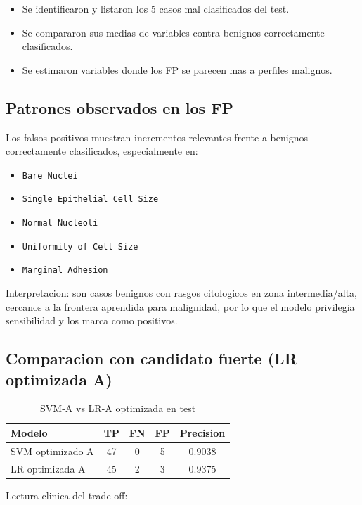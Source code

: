 \documentclass[11pt,a4paper]{article}
\begin{document}
\begin{itemize}[leftmargin=1.2cm]
\item Se identificaron y listaron los 5 casos mal clasificados del test.
\item Se compararon sus medias de variables contra benignos correctamente clasificados.
\item Se estimaron variables donde los FP se parecen mas a perfiles malignos.
\end{itemize}

\subsection{Patrones observados en los FP}

Los falsos positivos muestran incrementos relevantes frente a benignos correctamente clasificados, especialmente en:

\begin{itemize}[leftmargin=1.2cm]
\item \texttt{Bare Nuclei}
\item \texttt{Single Epithelial Cell Size}
\item \texttt{Normal Nucleoli}
\item \texttt{Uniformity of Cell Size}
\item \texttt{Marginal Adhesion}
\end{itemize}

Interpretacion: son casos benignos con rasgos citologicos en zona intermedia/alta, cercanos a la frontera aprendida para malignidad, por lo que el modelo privilegia sensibilidad y los marca como positivos.

\subsection{Comparacion con candidato fuerte (LR optimizada A)}

\begin{table}[H]
\centering
\caption{SVM-A vs LR-A optimizada en test}
\begin{tabular}{lcccc}
\toprule
Modelo & TP & FN & FP & Precision \\
\midrule
SVM optimizado A & 47 & 0 & 5 & 0.9038 \\
LR optimizada A & 45 & 2 & 3 & 0.9375 \\
\bottomrule
\end{tabular}
\end{table}

Lectura clinica del trade-off:
\end{document}
